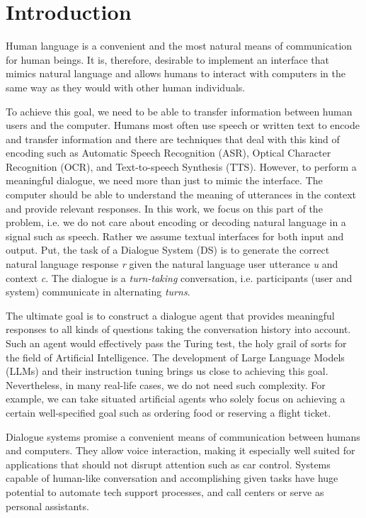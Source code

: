 \chapter{Introduction}%
\label{chap:intro}
Human language is a convenient and the most natural means of communication for human beings.
It is, therefore, desirable to implement an interface that mimics natural language and allows humans to interact with computers in the same way as they would with other human individuals.

To achieve this goal, we need to be able to transfer information between human users and the computer.
Humans most often use speech or written text to encode and transfer information and there are techniques that deal with this kind of encoding such as Automatic Speech Recognition (ASR), Optical Character Recognition (OCR), and Text-to-speech Synthesis (TTS).
However, to perform a meaningful dialogue, we need more than just to mimic the interface.
The computer should be able to understand the meaning of utterances in the context and provide relevant responses.
In this work, we focus on this part of the problem, i.e. we do not care about encoding or decoding natural language in a signal such as speech.
Rather we assume textual interfaces for both input and output.
Put, the task of a Dialogue System (DS) is to generate the correct natural language response \textit{r} given the natural language user utterance \textit{u} and context \textit{c}.
The dialogue is a \textit{turn-taking} conversation, i.e. participants (user and system) communicate in alternating \textit{turns}.

The ultimate goal is to construct a dialogue agent that provides meaningful responses to all kinds of questions taking the conversation history into account.
Such an agent would effectively pass the Turing test, the holy grail of sorts for the field of Artificial Intelligence.
The development of Large Language Models (LLMs) and their instruction tuning brings us close to achieving this goal.
Nevertheless, in many real-life cases, we do not need such complexity.
For example, we can take situated artificial agents who solely focus on achieving a certain well-specified goal such as ordering food or reserving a flight ticket.

Dialogue systems promise a convenient means of communication between humans and computers.
They allow voice interaction, making it especially well suited for applications that should not disrupt attention such as car control.
Systems capable of human-like conversation and accomplishing given tasks have huge potential to automate tech support processes, and call centers or serve as personal assistants.

